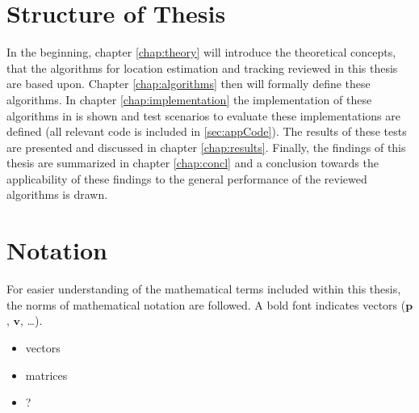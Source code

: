 \section{Structure of Thesis}
	In the beginning, chapter \ref{chap:theory} will introduce the theoretical concepts, that the algorithms for location estimation and tracking reviewed in this thesis are based upon. Chapter \ref{chap:algorithms} then will formally define these algorithms. In chapter \ref{chap:implementation} the implementation of these algorithms in \matlab is shown and test scenarios to evaluate these implementations are defined (all relevant code is included in \ref{sec:appCode}). The results of these tests are presented and discussed in chapter \ref{chap:results}. Finally, the findings of this thesis are summarized in chapter \ref{chap:concl} and a conclusion towards the applicability of these findings to the general performance of the reviewed algorithms is drawn.
\section{Notation}
\newcommand{\vect}[1]{\mathbf{#1}}
For easier understanding of the mathematical terms included within this thesis, the norms of mathematical notation are followed. A bold font indicates vectors ($\vect{p}$, $\vect{v}$, \dots).

\begin{itemize}
	\item vectors
	\item matrices
	\item ?
\end{itemize}
